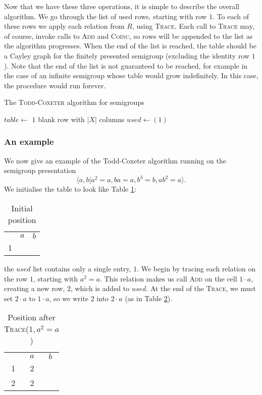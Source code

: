 Now that we have these three operations, it is simple to describe the overall
algorithm.  We go through the list of used rows, starting with row $1$.  To each
of these rows we apply each relation from $R$, using \textsc{Trace}.  Each call
to \textsc{Trace} may, of course, invoke calls to \textsc{Add} and
\textsc{Coinc}, so rows will be appended to the list as the algorithm
progresses.  When the end of the list is reached, the table should be a Cayley
graph for the finitely presented semigroup (excluding the identity row $1$).
Note that the end of the list is not guaranteed to be reached, for example in
the case of an infinite semigroup whose table would grow indefinitely.  In this
case, the procedure would run forever.

\begin{algorithm}
\caption{The \textsc{Todd-Coxeter} algorithm for semigroups}
\begin{algorithmic}[1]
\State $table \gets $ $1$ blank row with $|X|$ columns
\State $used \gets (1)$
    \State {}
  \EndFor
\EndFor
\EndProcedure
\end{algorithmic}
\end{algorithm}

\subsubsection{An example}
We now give an example of the Todd-Coxeter algorithm running on the semigroup
presentation
$$\langle a, b | a^2=a, ba=a, b^3=b, ab^2=a \rangle.$$
We initialise the table to look like Table \ref{tab:tc1}:
\begin{table}[H]
  \centering
  \begin{tabular}{c | c | c |}
    \multicolumn{1}{c}{} &
    \multicolumn{1}{c}{$a$} &
    \multicolumn{1}{c}{$b$} \\
    \cline{2-3}
    1 & & \\
    \cline{2-3}
  \end{tabular}
  \caption{Initial position}
  \label{tab:tc1}
\end{table}
the $used$ list contains only a single entry, $1$.  We begin by tracing each
relation on the row $1$, starting with $a^2=a$.  This relation makes us call
\textsc{Add} on the cell $1 \cdot a$, creating a new row, $2$, which is added to
$used$.  At the end of the \textsc{Trace}, we must set $2 \cdot a$ to $1 \cdot
a$, so we write $2$ into $2 \cdot a$ (as in Table \ref{tab:tc2}).
\begin{table}[H]
  \centering
  \begin{tabular}{c | c | c |}
    \multicolumn{1}{c}{} &
    \multicolumn{1}{c}{$a$} &
    \multicolumn{1}{c}{$b$} \\
    \cline{2-3}
    1 & 2 & \\
    \cline{2-3}
    2 & 2 & \\
    \cline{2-3}
  \end{tabular}
  \caption{Position after \textsc{Trace}($1, a^2=a$)}
  \label{tab:tc2}
\end{table}

